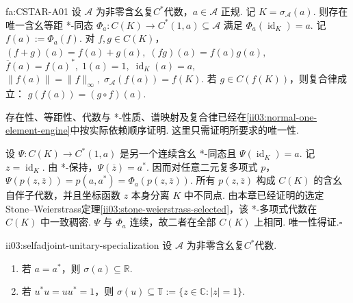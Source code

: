 \begin{FATheorem}[A][正规元连续函数演算]{fa:CSTAR-A01}
设 \(\displaystyle\mathcal A\) 为非零含幺复\(\displaystyle C^*\)代数，\(\displaystyle a\in\mathcal A\) 正规. 记 \(\displaystyle K=\sigma_{\mathcal A}(a)\). 则存在唯一含幺等距 *-同态
\(\displaystyle \Phi_a:C(K)\longrightarrow C^*(1,a)\subseteq\mathcal A\)
满足
\(\displaystyle \Phi_a(\operatorname{id}_K)=a.\)
记 \(\displaystyle f(a):=\Phi_a(f)\). 对 \(\displaystyle f,g\in C(K)\)，
\(\displaystyle (f+g)(a)=f(a)+g(a), \; (fg)(a)=f(a)g(a),\)
\(\displaystyle \overline f(a)=f(a)^*, \; 1(a)=1, \; \operatorname{id}_K(a)=a,\)
\(\displaystyle \|f(a)\|=\|f\|_\infty, \; \sigma_{\mathcal A}(f(a))=f(K).\)
若 \(\displaystyle g\in C(f(K))\)，则复合律成立：
\(\displaystyle g(f(a))=(g\circ f)(a).\)
\end{FATheorem}

\begin{FAProof}
存在性、等距性、代数与 *-性质、谱映射及复合律已经在\autoref{ii03:normal-one-element-engine}中按实际依赖顺序证明. 这里只需证明所要求的唯一性.

设 \(\displaystyle\Psi:C(K)\to C^*(1,a)\) 是另一个连续含幺 *-同态且 \(\displaystyle\Psi(\operatorname{id}_K)=a\). 记 \(\displaystyle z=\operatorname{id}_K\). 由 *-保持，\(\displaystyle\Psi(\overline z)=a^*\). 因而对任意二元复多项式 \(\displaystyle p\)，
\(\displaystyle \Psi(p(z,\overline z))=p(a,a^*)=\Phi_a(p(z,\overline z)).\)
所有 \(\displaystyle p(z,\overline z)\) 构成 \(\displaystyle C(K)\) 的含幺自伴子代数，并且坐标函数 \(\displaystyle z\) 本身分离 \(\displaystyle K\) 中不同点. 由本章已经证明的选定Stone--Weierstrass定理\autoref{ii03:stone-weierstrass-selected}，该 *-多项式代数在 \(\displaystyle C(K)\) 中一致稠密. \(\displaystyle\Psi\) 与 \(\displaystyle\Phi_a\) 连续，故二者在全部 \(\displaystyle C(K)\) 上相同. 唯一性得证.\hfill\(\square\)
\end{FAProof}

\begin{FACorollary}[B][自伴与酉的谱位置]{ii03:selfadjoint-unitary-specialization}
设 \(\displaystyle\mathcal A\) 为非零含幺复\(\displaystyle C^*\)代数.
\begin{enumerate}[label=\textnormal{(\roman*)}]
\item 若 \(\displaystyle a=a^*\)，则 \(\displaystyle\sigma(a)\subseteq\mathbb R\).
\item 若 \(\displaystyle u^*u=uu^*=1\)，则
\(\displaystyle \sigma(u)\subseteq\mathbb T:=\{z\in\mathbb C:|z|=1\}.\)
\end{enumerate}
\end{FACorollary}

